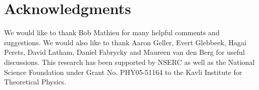 
\section*{Acknowledgments}

We would like to thank Bob Mathieu for many helpful comments and
suggestions.  We would also like to thank Aaron Geller, Evert
Glebbeek, Hagai Perets, David Latham, Daniel Fabrycky and Maureen van
den Berg for useful discussions.  This research has been supported by
NSERC as well as the National Science Foundation under Grant
No. PHY05-51164 to the Kavli Institute for Theoretical Physics.


